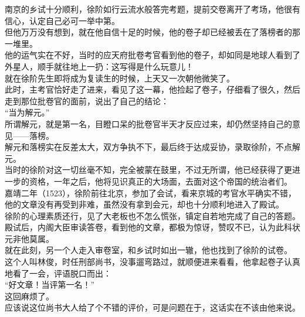 \begin{multicols}{\theparacolNo}
南京的乡试十分顺利，徐阶如行云流水般答完考题，提前交卷离开了考场，他很有信心，认定自己必可一举中第。\\

但他万万没有想到，就在他自信十足的时候，他的卷子却已经被丢在了落榜者的那一堆里。\\

他的运气实在不好，当时的应天府批卷考官看到他的卷子，却如同是地球人看到了外星人，顺手就往地上一扔：这写得是什么玩意儿！\\

就在徐阶先生即将成为复读生的时候，上天又一次朝他微笑了。\\

此时，主考官恰好走了进来，看见了这一幕，他捡起了卷子，仔细看了很久，然后走到那位批卷官的面前，说出了自己的结论：\\

“当为解元。”\\

所谓解元，就是第一名，目瞪口呆的批卷官半天才反应过来，却仍然坚持自己的意见——落榜。\\

解元和落榜实在反差太大，双方争执不下，最后终于达成妥协，录取徐阶，不点解元。\\

当时的徐阶对这一切丝毫不知，完全被蒙在鼓里，不过无所谓，他已经获得了更进一步的资格，一年之后，他将见识真正的大场面，去面对这个帝国的统治者们。\\

嘉靖二年（1523），徐阶前往北京，参加了会试，看来京城的考官水平确实不错，他的文章没有再受到非难，虽然没有拿到会元，却也十分顺利地进入了殿试。\\

徐阶的心理素质还行，见了大老板也不怎么慌张，镇定自若地完成了自己的答题。殿试后，内阁大臣审读答卷，看到他的文章，都极为惊讶，赞叹不已，认为此科状元非他莫属。\\

就在此刻，另一个人走入审卷室，和乡试时如出一辙，他也找到了徐阶的试卷。\\

这个人叫林俊，时任刑部尚书，没事遛弯路过，就顺便进来看看，他拿起卷子认真地看了一会，评语脱口而出：\\

“好文章！当评第一名！”\\

这回麻烦了。\\

应该说这位尚书大人给了个不错的评价，可是问题在于，这话实在不该由他来说。\\


\end{multicols}
